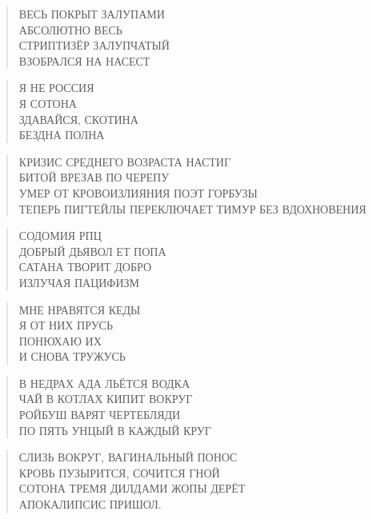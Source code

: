 \poemtitle{***}
\begin{verse}
ВЕСЬ ПОКРЫТ ЗАЛУПАМИ\\
АБСОЛЮТНО ВЕСЬ\\
СТРИПТИЗЁР ЗАЛУПЧАТЫЙ\\
ВЗОБРАЛСЯ НА НАСЕСТ
\end{verse}

\poemtitle{***}
\begin{verse}
Я НЕ РОССИЯ\\
Я СОТОНА\\
ЗДАВАЙСЯ, СКОТИНА\\
БЕЗДНА ПОЛНА
\end{verse}

\poemtitle{***}
\begin{verse}
КРИЗИС СРЕДНЕГО ВОЗРАСТА НАСТИГ\\
БИТОЙ ВРЕЗАВ ПО ЧЕРЕПУ\\
УМЕР ОТ КРОВОИЗЛИЯНИЯ ПОЭТ ГОРБУЗЫ\\
ТЕПЕРЬ ПИГТЕЙЛЫ ПЕРЕКЛЮЧАЕТ ТИМУР БЕЗ ВДОХНОВЕНИЯ
\end{verse}

\poemtitle{***}
\begin{verse}
СОДОМИЯ РПЦ\\
ДОБРЫЙ ДЬЯВОЛ ЕТ ПОПА\\
САТАНА ТВОРИТ ДОБРО\\
ИЗЛУЧАЯ ПАЦИФИЗМ
\end{verse}

\poemtitle{***}
\begin{verse}
МНЕ НРАВЯТСЯ КЕДЫ\\
Я ОТ НИХ ПРУСЬ\\
ПОНЮХАЮ ИХ\\
И СНОВА ТРУЖУСЬ
\end{verse}

\poemtitle{***}
\begin{verse}
В НЕДРАХ АДА ЛЬЁТСЯ ВОДКА\\
ЧАЙ В КОТЛАХ КИПИТ ВОКРУГ\\
РОЙБУШ ВАРЯТ ЧЕРТЕБЛЯДИ\\
ПО ПЯТЬ УНЦЫЙ В КАЖДЫЙ КРУГ
\end{verse}

\poemtitle{***}
\begin{verse}
СЛИЗЬ ВОКРУГ, ВАГИНАЛЬНЫЙ ПОНОС\\
КРОВЬ ПУЗЫРИТСЯ, СОЧИТСЯ ГНОЙ\\
СОТОНА ТРЕМЯ ДИЛДАМИ ЖОПЫ ДЕРЁТ\\
АПОКАЛИПСИС ПРИШОЛ.
\end{verse}

